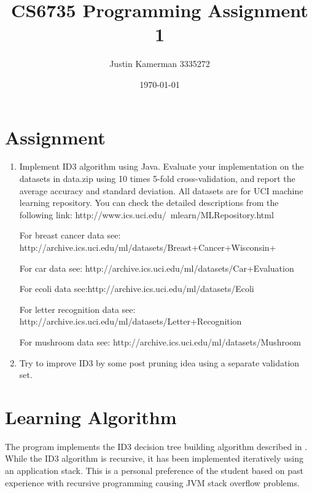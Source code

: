\documentclass[10pt]{report}
\title{CS6735 Programming Assignment 1}
\author{Justin Kamerman 3335272}
\date{\today}
\begin{document}
\maketitle
\renewcommand*\thesection{\arabic{section}}

\section{Assignment}
\begin{enumerate} 
\item Implement ID3 algorithm using Java. Evaluate your implementation
  on the datasets in data.zip using 10 times 5-fold cross-validation,
  and report the average accuracy and standard deviation. All datasets
  are for UCI machine learning repository. You can check the detailed
  descriptions from the following link: 
  http://www.ics.uci.edu/~mlearn/MLRepository.html

For breast cancer data see:
http://archive.ics.uci.edu/ml/datasets/Breast+Cancer+Wisconsin+%

For car data see:
http://archive.ics.uci.edu/ml/datasets/Car+Evaluation

For ecoli data see:http://archive.ics.uci.edu/ml/datasets/Ecoli

For letter recognition data see:
http://archive.ics.uci.edu/ml/datasets/Letter+Recognition

For mushroom data see: http://archive.ics.uci.edu/ml/datasets/Mushroom

\item Try to improve ID3 by some post pruning idea using a separate
  validation set.
\end{enumerate}

\section{Learning Algorithm}
\label{sec:learningalgorithm}
The program implements the ID3 decision tree building algorithm
described in \cite{Mitchell1997}. While the ID3 algorithm is
recursive, it has been implemented iteratively using an application
stack. This is a personal preference of the student based on past
experience with recursive programming causing JVM stack overflow
problems.
\end{document}
